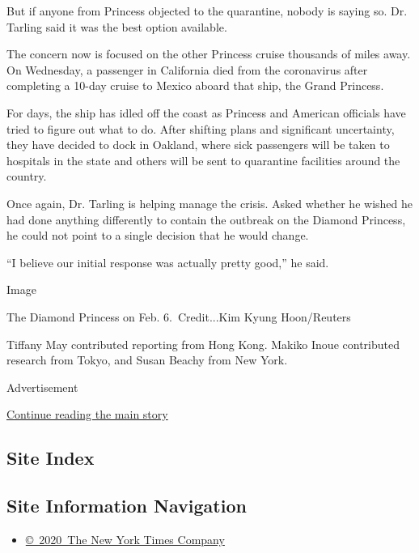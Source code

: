 But if anyone from Princess objected to the quarantine, nobody is saying
so. Dr. Tarling said it was the best option available.

The concern now is focused on the other Princess cruise thousands of
miles away. On Wednesday, a passenger in California died from the
coronavirus after completing a 10-day cruise to Mexico aboard that ship,
the Grand Princess.

For days, the ship has idled off the coast as Princess and American
officials have tried to figure out what to do. After shifting plans and
significant uncertainty, they have decided to dock in Oakland, where
sick passengers will be taken to hospitals in the state and others will
be sent to quarantine facilities around the country.

Once again, Dr. Tarling is helping manage the crisis. Asked whether he
wished he had done anything differently to contain the outbreak on the
Diamond Princess, he could not point to a single decision that he would
change.

``I believe our initial response was actually pretty good,'' he said.

Image

The Diamond Princess on Feb. 6.~Credit...Kim Kyung Hoon/Reuters

Tiffany May contributed reporting from Hong Kong. Makiko Inoue
contributed research from Tokyo, and Susan Beachy from New York.

Advertisement

\protect\hyperlink{after-bottom}{Continue reading the main story}

\hypertarget{site-index}{%
\subsection{Site Index}\label{site-index}}

\hypertarget{site-information-navigation}{%
\subsection{Site Information
Navigation}\label{site-information-navigation}}

\begin{itemize}
\tightlist
\item
  \href{https://help.nytimes3xbfgragh.onion/hc/en-us/articles/115014792127-Copyright-notice}{©~2020~The
  New York Times Company}
\end{itemize}

